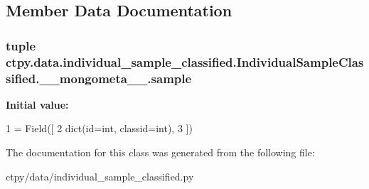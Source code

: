 \subsection{Member Data Documentation}
\hypertarget{classctpy_1_1data_1_1individual__sample__classified_1_1_individual_sample_classified_1_1____mongometa_____a7fc67cbe6f9e228ae10f5a45585e7ac8}{
\subsubsection[{sample}]{\setlength{\rightskip}{0pt plus 5cm}tuple ctpy.\-data.\-individual\-\_\-sample\-\_\-classified.\-Individual\-Sample\-Classified.\-\_\-\-\_\-mongometa\-\_\-\-\_\-.\-sample\hspace{0.3cm}{\ttfamily [static]}}}\label{classctpy_1_1data_1_1individual__sample__classified_1_1_individual_sample_classified_1_1____mongometa_____a7fc67cbe6f9e228ae10f5a45585e7ac8}
{\bfseries Initial value\-:}
\begin{DoxyCode}
1 = Field([
2             dict(id=int, classid=int),
3         ])
\end{DoxyCode}


The documentation for this class was generated from the following file\-:\begin{DoxyCompactItemize}
\item 
ctpy/data/individual\-\_\-sample\-\_\-classified.\-py\end{DoxyCompactItemize}
